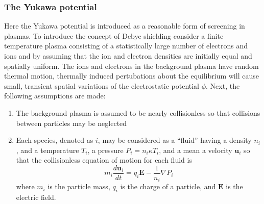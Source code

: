 \subsubsection{The Yukawa potential}
Here the Yukawa potential is introduced as a reasonable form of screening in plasmas. To introduce the concept of Debye shielding consider a finite temperature plasma consisting of a statistically large number of electrons and ions and by assuming that the ion and electron densities are initially equal and spatially uniform. The ions and electrons in the background plasma have random thermal motion, thermally induced pertubations about the equilibrium will cause small, transient spatial variations of the electrostatic potential $\phi$. Next, the following assumptions are made:
\begin{enumerate}
    \item The background plasma is assumed to be nearly collisionless so that collisions between particles may be neglected
    \item Each species, denoted as $i$, may be considered as a ``fluid'' having a density $n_i$, and a temperature $T_i$, a pressure $P_i = n_i \kappa T_i$, and a mean a velocity $\boldsymbol{u}_i$ so that the collisionless equation of motion for each fluid is
    \begin{equation} \label{eqn:collisionless-motion}
        m_i \dfrac{d \boldsymbol{u}_i}{dt} = q_i \boldsymbol{E} - \dfrac{1}{n_i} \nabla P_i
    \end{equation}
    where $m_i$ is the particle mass, $q_i$ is the charge of a particle, and $\boldsymbol{E}$ is the electric field.
\end{enumerate}

